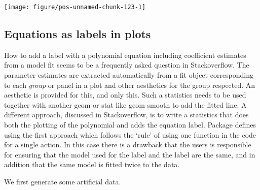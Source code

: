 \documentclass[paper=a4,10pt,div=17,headsepline,BCOR=12mm,twoside,open=right]{scrbook}\usepackage{knitr}
\begin{document}
\begin{knitrout}\footnotesize
{}\color{fgcolor}\begin{kframe}
\begin{alltt}
  \hlopt{+}
  \hlstd{(} \hlstd{=} \hlstd{)} \hlopt{+} \hlstd{(} \hlstd{=} \hlstd{)}
\end{alltt}
\end{kframe}

{\centering \texttt{[image: figure/pos-unnamed-chunk-123-1]} 

}



\end{knitrout}

\subsection{Equations as labels in plots}

How to add a label with a polynomial equation including coefficient estimates from a model fit seems to be a frequently asked question in Stackoverflow. The parameter estimates are extracted automatically from a fit object corresponding to each \textit{group} or panel in a plot and other aesthetics for the group respected. An aesthetic is provided for this, and only this. Such a statistics needs to be used together with another geom or stat like geom smooth to add the fitted line. A different approach, discussed in Stackoverflow, is to write a statistics that does both the plotting of the polynomial and adds the equation label. Package \ggpmisc defines  using the first approach which follows the `rule' of using one function in the code for a single action. In this case there is a drawback that the users is responsible for ensuring that the model used for the label and the label are the same, and in addition that the same model is fitted twice to the data.

We first generate some artificial data.
\end{document}
